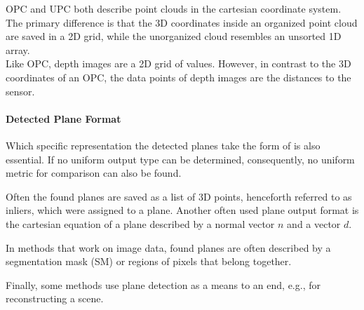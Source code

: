 \documentclass[main.tex]{subfiles}
\begin{document}
OPC and UPC both describe point clouds in the cartesian coordinate system. The primary difference is that the 3D coordinates inside
an organized point cloud are saved in a 2D grid, while the unorganized cloud resembles an unsorted 1D array.\\
Like OPC, depth images are a 2D grid of values. However, in contrast to the 3D coordinates of an OPC, the data points of depth images
are the distances to the sensor.



\paragraph{Detected Plane Format} \label{subsec:planeformat}
Which specific representation the detected planes take the form of is also essential.
If no uniform output type can be determined, consequently, no uniform metric for comparison can also be found.


Often the found planes are saved as a list of 3D points, henceforth referred to as inliers, which were assigned to a plane.
Another often used plane output format is the cartesian equation of a plane described by a normal vector $n$ and a vector $d$.

In methods that work on image data, found planes are often described by a segmentation mask (SM) or regions of pixels that belong together.

Finally, some methods use plane detection as a means to an end, e.g., for reconstructing a scene.
\end{document}
